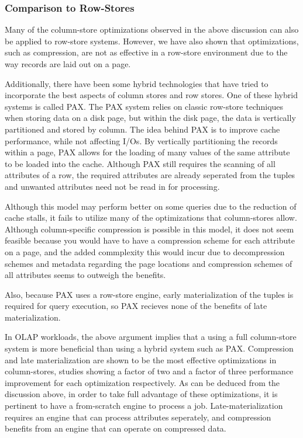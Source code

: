 

\subsubsection*{Comparison to Row-Stores}

Many of the column-store optimizations observed in the above discussion can also be applied to row-store systems. However, we have also shown that optimizations, such as compression, are not as effective in a row-store environment due to the way records are laid out on a page.


Additionally, there have been some hybrid technologies that have tried to incorporate the best aspects of column stores and row stores. One of these hybrid systems is called PAX. The PAX system relies on classic row-store techniques when storing data on a disk page, but within the disk page, the data is vertically partitioned and stored by column. The idea behind PAX is to improve cache performance, while not affecting I/Os\cite{PAX}. By vertically partitioning the records within a page, PAX allows for the loading of many values of the same attribute to be loaded into the cache. Although PAX still requires the scanning of all attributes of a row, the required attributes are already seperated from the tuples and unwanted attributes need not be read in for processing. 


Although this model may perform better on some queries due to the reduction of cache stalls, it fails to utilize many of the optimizations that column-stores allow. Although column-specific compression is possible in this model, it does not seem feasible because you would have to have a compression scheme for each attribute on a page, and the added commplexity this would incur due to decompression schemes and metadata regarding the page locations and compression schemes of all attributes seems to outweigh the benefits.


Also, because PAX uses a row-store engine, early materialization of the tuples is required for query execution, so PAX recieves none of the benefits of late materialization\cite{PAX}.


In OLAP workloads, the above argument implies that a using a full column-store system is more beneficial than using a hybrid system such as PAX. Compression and late materialization are shown to be the most effective optimizations in column-stores, studies showing a factor of two and a factor of three performance improvement for each optimization respectively\cite{colvsrow}. As can be deduced from the discussion above, in order to take full advantage of these optimizations, it is pertinent to have a from-scratch engine to process a job. Late-materialization requires an engine that can process attributes seperately, and compression benefits from an engine that can operate on compressed data.


